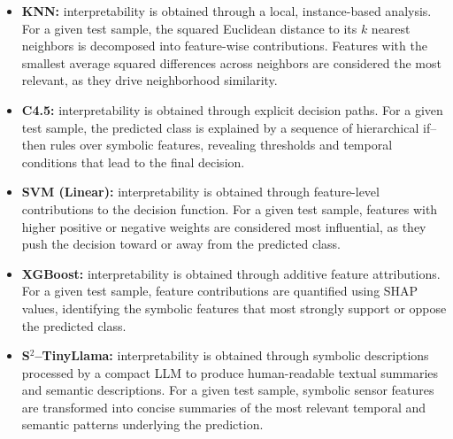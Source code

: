 \documentclass[preprint,12pt]{elsarticle}
\begin{document}
\begin{itemize}\setlength\itemsep{2pt}
    \item \textbf{KNN:} interpretability is obtained through a local, instance-based analysis. For a given test sample, the squared Euclidean distance to its $k$ nearest neighbors is decomposed into feature-wise contributions. Features with the smallest average squared differences across neighbors are considered the most relevant, as they drive neighborhood similarity.
    \item \textbf{C4.5:} interpretability is obtained through explicit decision paths. For a given test sample, the predicted class is explained by a sequence of hierarchical if--then rules over symbolic features, revealing thresholds and temporal conditions that lead to the final decision.
    \item \textbf{SVM (Linear):} interpretability is obtained through feature-level contributions to the decision function. For a given test sample, features with higher positive or negative weights are considered most influential, as they push the decision toward or away from the predicted class.
    \item \textbf{XGBoost:} interpretability is obtained through additive feature attributions. For a given test sample, feature contributions are quantified using SHAP values, identifying the symbolic features that most strongly support or oppose the predicted class.
    \item \textbf{S$^2$--TinyLlama:} interpretability is obtained through symbolic descriptions processed by a compact LLM to produce human-readable textual summaries and semantic descriptions. For a given test sample, symbolic sensor features are transformed into concise summaries of the most relevant temporal and semantic patterns underlying the prediction.
\end{itemize}
\end{document}
